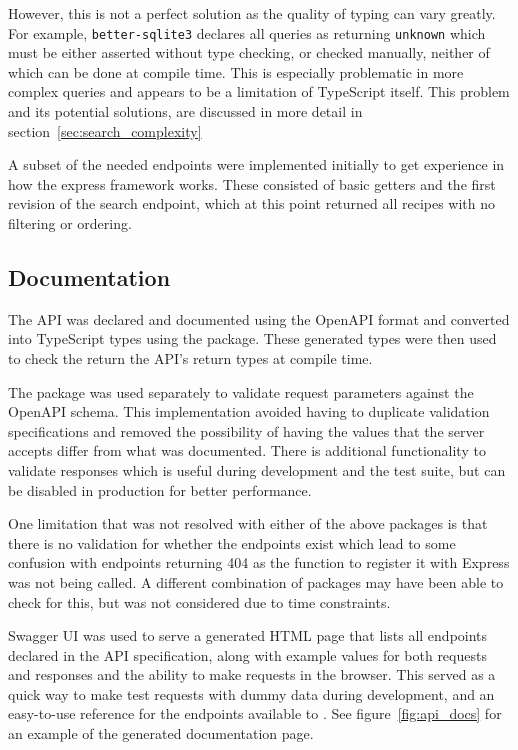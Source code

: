 However, this is not a perfect solution as the quality of typing can vary greatly. For example, \texttt{better-sqlite3}
declares all queries as returning \texttt{unknown} which must be either asserted without type checking, or checked manually, neither of which
can be done at compile time. This is especially problematic in more complex queries and appears to be a limitation of TypeScript itself. This
problem and its potential solutions, are discussed in more detail in section~\ref{sec:search_complexity}

A subset of the needed endpoints were implemented initially to get experience in how the express framework works.
These consisted of basic getters and the first revision of the search endpoint, which at this point returned all
recipes with no filtering or ordering.

\subsection{Documentation}
The API was declared and documented using the OpenAPI format and converted
into TypeScript types using the  package. These
generated types were then used to check the return the API's return types at compile time.

The  package was used separately to validate
request parameters against the OpenAPI schema. This implementation avoided having
to duplicate validation specifications and removed the possibility of having the values that
the server accepts differ from what was documented. There is additional functionality to validate
responses which is useful during development and the test suite, but can be disabled in production
for better performance.

One limitation that was not resolved with either of the above packages is that there is no validation
for whether the endpoints exist which lead to some confusion with endpoints returning 404 as the function to
register it with Express was not being called. A different combination of packages may have been able to check for this,
but was not considered due to time constraints.

Swagger UI was used to serve a generated HTML page that lists all endpoints declared in
the API specification, along with example values for both requests and responses and the ability to make requests in
the browser. This served as a quick way to make test requests with dummy data during development, and an easy-to-use
reference for the endpoints available to . See figure~\ref{fig:api_docs} for an example of the
generated documentation page.

